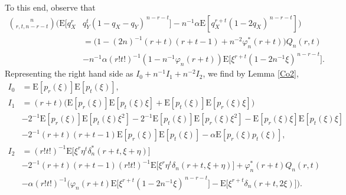 \documentclass[12]{article}
\newcommand{\rE}{\mathrm{E}} %
\begin{document}
To this end, observe that
\begin{align*}
 {n \choose r,t,n-r-t}
\Big(\rE\!\Big[q_X^r &q_Y^t (1-q_X-q_Y)^{\,n-r-t}\Big]
 - n^{-1}\alpha \rE\!\left[q_X^{r+t}(1-2q_X)^{\,n-r-t}\right]\Big)\\
 &=\Big(1-(2n)^{-1}(r+t)(r+t-1)+n^{-2}\varphi^*_n(r+t)\Big)Q_n(r,t)\\
 &-n^{-1}\alpha (r!t!)^{-1}(1-n^{-1}\varphi_n(r+t))\rE\Big[\xi^{r+t}(1-2n^{-1}\xi)^{\,n-r-t}\Big].
\end{align*}
Representing the right hand side as $I_0+n^{-1}I_1+n^{-2}I_2$, we find by Lemma \ref{Co2},
\begin{align*}
I_0&=\rE[p_r(\xi)]\rE[p_t(\xi)], \\
I_{1}&=(r+t)\big(\rE[p_r(\xi)]\rE[p_t(\xi)\xi]+\rE[p_t(\xi)]\rE[p_r(\xi)\xi]\big) \nonumber\\
&-2^{-1}\rE[p_r(\xi)]\rE[p_t(\xi)\xi^2]-2^{-1}\rE[p_t(\xi)]\rE[p_r(\xi)\xi^2]-\rE[p_r(\xi)\xi]\rE[p_t(\xi)\xi]\\
&-2^{-1}(r+t)(r+t-1)\rE[p_r(\xi)]\rE[p_t(\xi)]-\alpha \rE[p_r(\xi)p_t(\xi)],\\
I_{2}&=(r!t!)^{-1}\rE\Big[\xi^r\eta^t \delta_n^*(r+t,\xi+\eta)\Big]\\
&-2^{-1}(r+t)(r+t-1)(r! t!)^{-1}\rE\Big[\xi^r\eta^t\delta_n(r+t,\xi+\eta)\Big]+\varphi^*_n(r+t)Q_n(r,t)\\
&-\alpha(r!t!)^{-1}\Big(\varphi_n(r+t)\rE\Big[\xi^{r+t}(1-2n^{-1}\xi)^{\,n-r-t}\Big]-\rE\Big[\xi^{r+t}\delta_n(r+t, 2\xi)\Big]\Big).
\end{align*}

\end{document}
